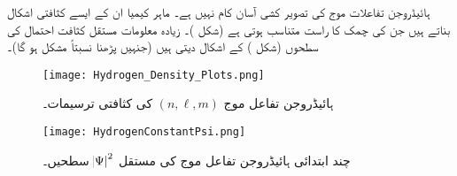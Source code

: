ہائیڈروجن تفاعلات موج کی تصویر کشی آسان کام نہیں ہے۔ ماہر کیمیا ان کے ایسے کثافتی اشکال بناتے ہیں جن کی چمک  کا راست متناسب ہوتی ہے (شکل )۔ زیادہ معلومات مستقل کثافت احتمال کی سطحوں (شکل ) کے اشکال دیتی ہیں (جنہیں پڑھنا نسبتاً مشکل ہو گا)۔
\begin{figure}
\centering
\texttt{[image: Hydrogen\_Density\_Plots.png]}
\caption{ہائیڈروجن تفاعل موج $(n,\ell,m)$ کی کثافتی ترسیمات۔}
\label{شکل_تین_ابعادی_ہائیڈروجن_تفاعل_موج_کثافت}
\end{figure}
%
\begin{figure}
\centering
\texttt{[image: HydrogenConstantPsi.png]}
\caption{چند ابتدائی ہائیڈروجن تفاعل موج کی مستقل $\abs{\Psi}^2$ سطحیں۔}
\label{شکل_تین_ابعادی_ہائیڈروجن_تفاعل_مستقل}
\end{figure}

